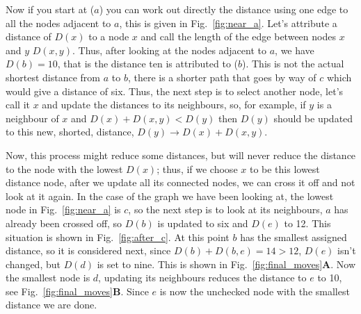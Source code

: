 \documentclass[11pt,a4paper]{scrartcl}
\begin{document}
Now if you start at ($a$) you can work out directly the distance using
one edge to all the nodes adjacent to $a$, this is given in
Fig.~\ref{fig:near_a}. Let's attribute a distance of $D(x)$ to a node
$x$ and call the length of the edge between nodes $x$ and $y$
$D(x,y)$. Thus, after looking at the nodes adjacent to $a$, we have
$D(b)=10$, that is the distance ten is attributed to ($b$). This is
not the actual shortest distance from $a$ to $b$, there is a shorter
path that goes by way of $c$ which would give a distance of six. Thus,
the next step is to select another node, let's call it $x$ and
update the distances to its neighbours, so, for example, if $y$ is a neighbour of $x$ and $D(x)+D(x,y)<D(y)$ then $D(y)$ should be updated to this new, shorted, distance, $D(y)\rightarrow D(x)+D(x,y)$.

Now, this process might reduce some distances, but will never reduce
the distance to the node with the lowest $D(x)$; thus, if we choose
$x$ to be this lowest distance node, after we update all its connected
nodes, we can cross it off and not look at it again. In the case of
the graph we have been looking at, the lowest node in
Fig.~\ref{fig:near_a} is $c$, so the next step is to look at its
neighbours, $a$ has already been crossed off, so $D(b)$ is updated to
six and $D(e)$ to 12. This situation is shown in
Fig.~\ref{fig:after_c}. At this point $b$ has the smallest assigned
distance, so it is considered next, since $D(b)+D(b,e)=14>12$, $D(e)$
isn't changed, but $D(d)$ is set to nine. This is shown in
Fig.~\ref{fig:final_moves}\textbf{A}. Now the smallest node is $d$, updating
its neighbours reduces the distance to $e$ to 10, see
Fig.~\ref{fig:final_moves}\textbf{B}. Since $e$ is now the unchecked node
with the smallest distance we are done.
\end{document}
